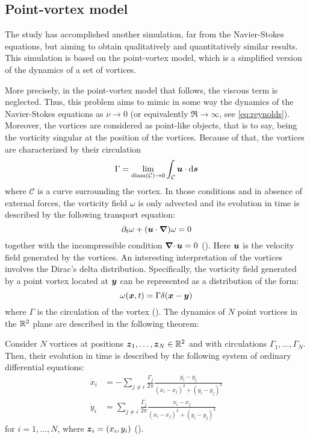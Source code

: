 \documentclass[../main.tex]{subfiles}
\begin{document}
\subsection{Point-vortex model}
The study has accomplished another simulation, far from the Navier-Stokes equations, but aiming to obtain qualitatively and quantitatively similar results. This simulation is based on the point-vortex model, which is a simplified version of the dynamics of a set of vortices.

More precisely, in the point-vortex model that follows, the viscous term is neglected. Thus, this problem aims to mimic in some way the dynamics of the Navier-Stokes equations as $\nu \to 0$ (or equivalently $\Re\to\infty$, see \cref{eq:reynolds}). Moreover, the vortices are considered as point-like objects, that is to say, being the vorticity singular at the position of the vortices. Because of that, the vortices are characterized by their circulation
\begin{equation}
	\Gamma = \lim_{\operatorname{diam}(\mathcal{C})\to 0} \int_{\mathcal{C}} \boldsymbol{u} \cdot \dd{\boldsymbol{s}}
\end{equation}
where $\mathcal{C}$ is a curve surrounding the vortex. In those conditions and in absence of external forces, the vorticity field $\omega$ is only advected and its evolution in time is described by the following transport equation:
\begin{equation}
	\partial_t \omega + (\boldsymbol{u} \cdot \grad) \omega = 0
\end{equation}
together with the incompressible condition $\operatorname{\boldsymbol{\nabla}\cdot} \boldsymbol{u}=0$ (\cite{pointvortexmath}). Here $\boldsymbol{u}$ is the velocity field generated by the vortices. An interesting interpretation of the vortices involves the Dirac's delta distribution. Specifically, the vorticity field generated by a point vortex located at $\boldsymbol{y}$ can be represented as a distribution of the form:
\begin{equation}\label{eq:vorticity_delta}
	\omega(\boldsymbol{x}, t) = \Gamma \delta(\boldsymbol{x}-\boldsymbol{y})
\end{equation}
where $\Gamma$ is the circulation of the vortex (\cite{Saffman}). The dynamics of $N$ point vortices in the $\mathbb{R}^2$ plane are described in the following theorem:
\\
\begin{theorem}
	Consider $N$ vortices at positions $\boldsymbol{z}_1,\ldots,\boldsymbol{z}_N\in \mathbb{R}^2$ and with circulations $\Gamma_1,\ldots,\Gamma_N$. Then, their evolution in time is described by the following system of ordinary differential equations:
	\begin{align}
		\dot{x}_i & = -\sum_{j\neq i} \frac{\Gamma_j}{2\pi} \frac{y_i-y_j}{{(x_i-x_j)}^2+{(y_i-y_j)}^2} \\
		\dot{y}_i & = \sum_{j\neq i} \frac{\Gamma_j}{2\pi} \frac{x_i-x_j}{{(x_i-x_j)}^2+{(y_i-y_j)}^2}
	\end{align}
	for $i=1,\ldots,N$, where $\boldsymbol{z}_i=(x_i,y_i)$ (\cite{pointvortex}).
\end{theorem}
\end{document}
